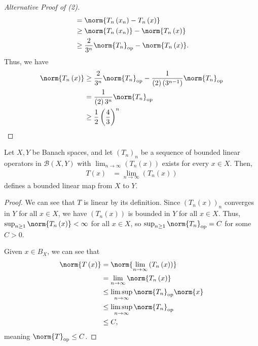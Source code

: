 \documentclass[10pt]{mypackage}
\begin{document}
\begin{proof}[Alternative Proof of (2)]
\begin{align*}
                                                                     &= \norm{T_n\left(x_n\right) - T_n\left(x\right)}\\
                                                                     &\geq \norm{T_n\left(x_n\right)} - \norm{T_n\left(x\right)}\\
                                                                     &\geq \frac{2}{3^n}\norm{T_n}_{\text{op}} - \norm{T_n\left(x\right)}.
    \end{align*}
    Thus, we have
    \begin{align*}
      \norm{T_n\left(x\right)} &\geq \frac{2}{3^n}\norm{T_n}_{\text{op}} - \frac{1}{\left(2\right)\left(3^{n-1}\right)}\norm{T_n}_{\text{op}}\\
                               &= \frac{1}{\left(2\right)3^{n}}\norm{T_n}_{\text{op}}\\
                               &\geq \frac{1}{2}\left(\frac{4}{3}\right)^{n}
    \end{align*}
  \end{proof}
  \begin{corollary}
    Let $X,Y$ be Banach spaces, and let $\left(T_n\right)_n$ be a sequence of bounded linear operators in $\mathcal{B}\left(X,Y\right)$ with $\lim_{n\rightarrow\infty}\left(T_n\left(x\right)\right)$ exists for every $x\in X$. Then,
    \begin{align*}
      T\left(x\right) &= \lim_{n\rightarrow\infty}\left(T_n\left(x\right)\right)
    \end{align*}
    defines a bounded linear map from $X$ to $Y$.
  \end{corollary}
  \begin{proof}
    We can see that $T$ is linear by its definition. Since $\left(T_n\left(x\right)\right)_n$ converges in $Y$ for all $x\in X$, we have $\left(T_n\left(x\right)\right)$ is bounded in $Y$ for all $x\in X$. Thus, $\sup_{n\geq 1}\norm{T_n\left(x\right)} < \infty$ for all $x\in X$, so $\sup_{n\geq 1}\norm{T_n}_{\text{op}} = C$ for some $C > 0$.\newline

    Given $x\in B_X$, we can see that
    \begin{align*}
      \norm{T\left(x\right)} &= \norm{\lim_{n\rightarrow\infty}\left(T_{n}\left(x\right)\right)}\\
                             &= \lim_{n\rightarrow\infty}\norm{T_n\left(x\right)}\\
                             &\leq \limsup_{n\rightarrow\infty}\norm{T_n}_{\text{op}}\norm{x}\\
                             &\leq \limsup_{n\rightarrow\infty}\norm{T_n}_{\text{op}}\\
                             &\leq C,
    \end{align*}
    meaning $\norm{T}_{\text{op}} \leq C$.
  \end{proof}
\end{document}
